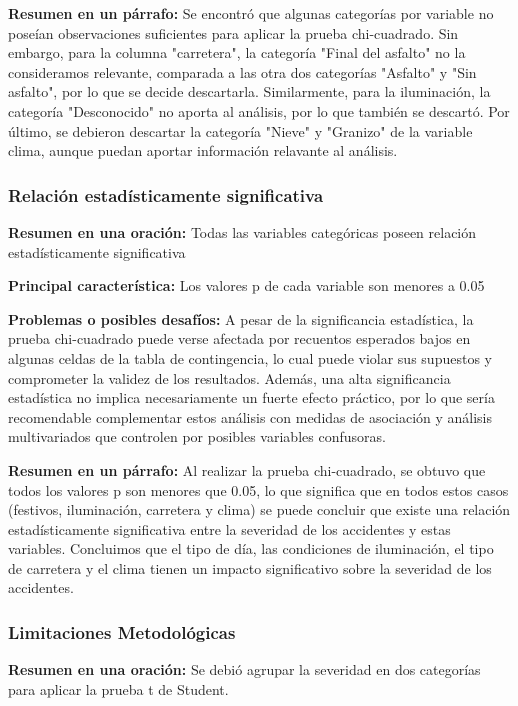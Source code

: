 \documentclass{book}
\begin{document}
\textbf{Resumen en un párrafo:} Se encontró que algunas categorías por variable no poseían observaciones suficientes para aplicar la prueba chi-cuadrado. Sin embargo, para la columna "carretera", la categoría "Final del asfalto" no la consideramos relevante, comparada a las otra dos categorías "Asfalto" y "Sin asfalto", por lo que se decide descartarla. Similarmente, para la iluminación, la categoría "Desconocido" no aporta al análisis, por lo que también se descartó. Por último, se debieron descartar la categoría "Nieve" y "Granizo" de la variable clima, aunque puedan aportar información relavante al análisis.


\subsubsection{Relación estadísticamente significativa}
\textbf{Resumen en una oración:} Todas las variables categóricas poseen relación estadísticamente significativa

\textbf{Principal característica:} Los valores p de cada variable son menores a 0.05

\textbf{Problemas o posibles desafíos:} A pesar de la significancia estadística, la prueba chi-cuadrado puede verse afectada por recuentos esperados bajos en algunas celdas de la tabla de contingencia, lo cual puede violar sus supuestos y comprometer la validez de los resultados. Además, una alta significancia estadística no implica necesariamente un fuerte efecto práctico, por lo que sería recomendable complementar estos análisis con medidas de asociación y análisis multivariados que controlen por posibles variables confusoras.

\textbf{Resumen en un párrafo:} Al realizar la prueba chi-cuadrado, se obtuvo que todos los valores p son menores que 0.05, lo que significa que en todos estos casos (festivos, iluminación, carretera y clima) se puede concluir que existe una relación estadísticamente significativa entre la severidad de los accidentes y estas variables. Concluimos que el tipo de día, las condiciones de iluminación, el tipo de carretera y el clima tienen un impacto significativo sobre la severidad de los accidentes.


\subsubsection{Limitaciones Metodológicas}
\textbf{Resumen en una oración:} Se debió agrupar la severidad en dos categorías para aplicar la prueba t de Student.
\end{document}
